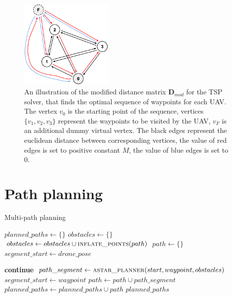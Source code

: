\begin{figure}[!h]
    \centering
    \includegraphics[width=0.4\textwidth]{./fig/photos/TSP.eps}
    \caption{An illustration of the modified distance matrix $\mathbf{D}_{mod}$ for the \ac{TSP} solver, that finds the optimal sequence of waypoints for each \ac{UAV}. 
    The vertex $v_{0}$ is the starting point of the sequence, vertices $\{v_{1}, v_{2}, v_{3}\}$ represent the waypoints to be visited by the \ac{UAV}, $v_{F}$ is an additional dummy virtual vertex. 
    The black edges represent the euclidean distance between corresponding vertices, the value of red edges is set to positive constant $M$, the value of blue edges is set to $0$. }
    \label{fig:tsp}
\end{figure}











\section{Path planning}
\begin{algorithm}
\caption{Multi-path planning}\label{alg:cap}
\begin{algorithmic}

  \State $planned\_paths \gets \{\}$
   
    \State $obstacles \gets \{\}$
      \State $obstacles \gets obstacles \cup \Call{inflate\_points}{path}$ %
    \EndFor
    \State $path \gets \{\}$
    \State $segment\_start \gets drone\_pose$

        \State \textbf{continue}
      \EndIf
      \State $path\_segment \gets \Call{astar\_planner}{start, waypoint, obstacles}$
      \State $segment\_start \gets waypoint$
      \State $path \gets path \cup path\_segment$
    \EndFor
    \State $planned\_paths \gets planned\_paths \cup path$
  \EndFor
  \State \Return $planned\_paths$
\EndFunction


\end{algorithmic}
\end{algorithm}






